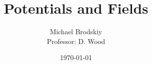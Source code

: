 


\title{Potentials and Fields}
\date{\today}
\author{Michael Brodskiy\\ \small Professor: D. Wood}



\maketitle


